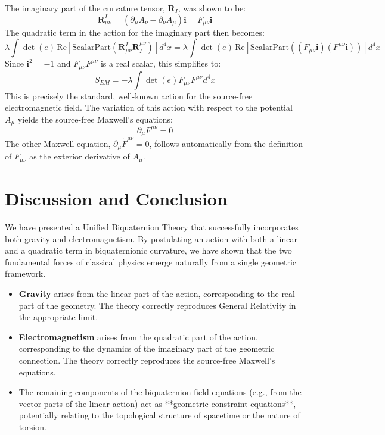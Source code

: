 \documentclass[11pt, a4paper]{article}
\begin{document}
The imaginary part of the curvature tensor, \( \mathbf{R}_I \), was shown to be:
\begin{equation}
\mathbf{R}^I_{\mu\nu} = (\partial_\mu A_\nu - \partial_\nu A_\mu) \mathbf{i} = F_{\mu\nu} \mathbf{i}
\end{equation}
The quadratic term in the action for the imaginary part then becomes:
\begin{equation}
\lambda \int \det(e) \, \text{Re}\left[\text{ScalarPart}(\mathbf{R}^I_{\mu\nu} \mathbf{R}^{\mu\nu}_I)\right] d^4x = \lambda \int \det(e) \, \text{Re}\left[\text{ScalarPart}((F_{\mu\nu}\mathbf{i})(F^{\mu\nu}\mathbf{i}))\right] d^4x
\end{equation}
Since \( \mathbf{i}^2 = -1 \) and \( F_{\mu\nu}F^{\mu\nu} \) is a real scalar, this simplifies to:
\begin{equation}
S_{EM} = -\lambda \int \det(e) F_{\mu\nu}F^{\mu\nu} d^4x
\end{equation}
This is precisely the standard, well-known action for the source-free electromagnetic field. The variation of this action with respect to the potential \( A_\mu \) yields the source-free Maxwell's equations:
\begin{equation}
\boxed{\partial_\mu F^{\mu\nu} = 0}
\end{equation}
The other Maxwell equation, \( \partial_\mu \tilde{F}^{\mu\nu} = 0 \), follows automatically from the definition of \( F_{\mu\nu} \) as the exterior derivative of \( A_\mu \).

\section{Discussion and Conclusion}
We have presented a Unified Biquaternion Theory that successfully incorporates both gravity and electromagnetism. By postulating an action with both a linear and a quadratic term in biquaternionic curvature, we have shown that the two fundamental forces of classical physics emerge naturally from a single geometric framework.

\begin{itemize}
    \item \textbf{Gravity} arises from the linear part of the action, corresponding to the real part of the geometry. The theory correctly reproduces General Relativity in the appropriate limit.
    \item \textbf{Electromagnetism} arises from the quadratic part of the action, corresponding to the dynamics of the imaginary part of the geometric connection. The theory correctly reproduces the source-free Maxwell's equations.
    \item The remaining components of the biquaternion field equations (e.g., from the vector parts of the linear action) act as **geometric constraint equations**, potentially relating to the topological structure of spacetime or the nature of torsion.
\end{itemize}
\end{document}
